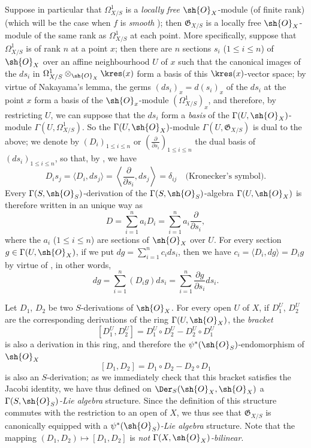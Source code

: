 \begin{env}[16.5.8]
\label{IV.16.5.8}
Suppose in particular that $\Omega_{X/S}^1$ is a \emph{locally free} $\sh{O}_X$-module (of finite rank) (which will be the case when $f$ is \emph{smooth} );
then $\mathfrak{G}_{X/S}$ is a locally free $\sh{O}_X$-module of the same rank as $\Omega_{X/S}^1$ at each point.
More specifically, suppose that $\Omega_{X/S}^1$ is of rank $n$ at a point $x$;
then there are $n$ sections $s_i$ ($1 \leq i \leq n$) of $\sh{O}_X$ over an affine neighbourhood $U$ of $x$ such that the canonical images of the $ds_i$ in $\Omega_{X/S}^1 \otimes_{\sh{O}_X} \kres(x)$ form a basis of this $\kres(x)$-vector space;
by virtue of Nakayama's lemma, the germs $(ds_i)_x = d(s_i)_x$ of the $ds_i$ at the point $x$ form a basis of the $\sh{O}_x$-module $(\Omega_{X/S}^1)_x$, and therefore, by restricting $U$, we can suppose that the $ds_i$ form a \emph{basis} of the $\Gamma(U, \sh{O}_X)$-module $\Gamma(U, \Omega_{X/S}^1)$.
So the $\Gamma(U, \sh{O}_X)$-module $\Gamma(U, \mathfrak{G}_{X/S})$ is dual to the above;
we denote by $(D_i)_{1 \leq i \leq n}$ or $\left(\frac{\partial}{\partial s_i}\right)_{1 \leq i \leq n}$ the dual basis of $(ds_i)_{1 \leq i \leq n}$, so that, by , we have
\[
\label{IV.16.5.8.1}
  D_i s_j = \langle D_i, ds_j \rangle = \left\langle \frac{\partial}{\partial s_i}, ds_j \right\rangle = \delta_{ij} \quad \text{(Kronecker's symbol)}.
  \tag{16.5.8.1}
\]
Every $\Gamma(S, \sh{O}_S)$-derivation of the $\Gamma(S, \sh{O}_S)$-algebra $\Gamma(U, \sh{O}_X)$ is therefore written in an unique way as 
\[
  D = \sum_{i = 1}^n a_i D_i = \sum_{i = 1}^n a_i \frac{\partial}{\partial s_i},
\] 
where the $a_i$ ($1 \leq i \leq n$) are sections of $\sh{O}_X$ over $U$.
For every section $g \in \Gamma(U, \sh{O}_X)$, if we put $dg = \sum_{i = 1}^n c_i ds_i$, then we have $c_i = \langle D_i, dg \rangle = D_i g$ by virtue of , in other words,
\[
\label{IV.16.5.8.2}
  dg = \sum_{i = 1}^n (D_i g) ds_i = \sum_{i = 1}^n \frac{\partial g}{\partial s_i} ds_i.
  \tag{16.5.8.2}
\]
\end{env}

\begin{env}[16.5.9]
\label{IV.16.5.9}
Let $D_1$, $D_2$ be two $S$-derivations of $\sh{O}_X$. 
For every open $U$ of $X$, if $D_1^U$, $D_2^U$ are the corresponding derivations of the ring $\Gamma(U, \sh{O}_X)$, the \emph{bracket}
\[
  [D_1^U, D_2^U] = D_1^U \circ D_2^U - D_2^U \circ D_1^U
\]
is also a derivation in this ring, and therefore the $\psi^*(\sh{O}_S)$-endomorphism of $\sh{O}_X$
\[
\label{IV.16.5.9.1}
  [D_1, D_2] = D_1 \circ D_2 - D_2 \circ D_1
  \tag{16.5.9.1}
\]
is also an $S$-derivation;
as we immediately check that this bracket satisfies the Jacobi identity, we have thus defined on $\Der_S(\sh{O}_X, \sh{O}_X)$ a \emph{$\Gamma(S, \sh{O}_S)$-Lie algebra} structure.
Since the definition of this structure commutes with the restriction to an open of $X$, we thus see that $\mathfrak{G}_{X/S}$ is canonically equipped with a \emph{ $\psi^*(\sh{O}_S)$-Lie algebra} structure.
Note that the mapping $(D_1, D_2) \mapsto [D_1, D_2]$ is \emph{not $\Gamma(X, \sh{O}_X)$-bilinear}.
\end{env} 

